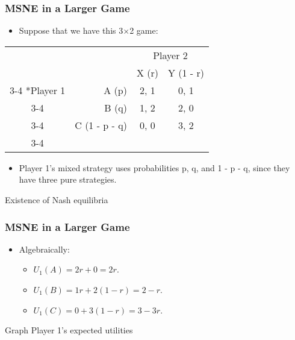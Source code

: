 
\begin{frame}
\frametitle{MSNE in a Larger Game}
\begin{itemize}
	\item Suppose that we have this 3$\times$2 game:
\end{itemize}
\begin{table}[h]
\centering
\begin{tabular}{cr|c|c|}
	& \multicolumn{1}{c}{} & \multicolumn{2}{c}{Player 2}\\
	& \multicolumn{1}{c}{} & \multicolumn{1}{c}{X (r)}  & \multicolumn{1}{c}{Y (1 - r)} \\\cline{3-4}
	\multirow{3}*{Player 1}  & A (p) & 2, 1 & 0, 1 \\\cline{3-4}
	& B (q) & 1, 2 & 2, 0 \\\cline{3-4}
	& C (1 - p - q) & 0, 0 & 3, 2 \\\cline{3-4}
\end{tabular}
\end{table}
\begin{itemize}
	\item Player 1's mixed strategy uses probabilities p, q, and 1 - p - q, since they have three pure strategies.
\end{itemize}
\end{frame}


\begin{frame}{Existence of Nash equilibria}
\frametitle{MSNE in a Larger Game}
\begin{itemize}
	\item Algebraically:
	\begin{itemize}
		\item $U_1(A) = 2r + 0 = 2r$.
		\item $U_1(B) = 1r + 2(1 - r) = 2 - r$.
		\item $U_1(C) = 0 + 3(1 - r) = 3 - 3r$.
	\end{itemize}
	\end{itemize}
\end{frame}


\begin{frame}{Graph Player 1's expected utilities}
\end{frame}

